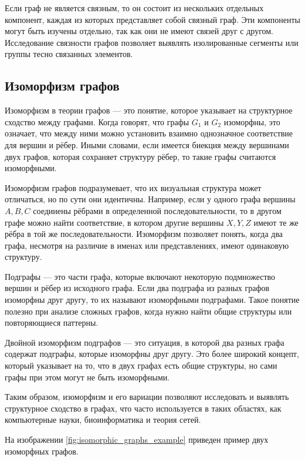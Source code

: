 Если граф не является связным, то он состоит из нескольких отдельных компонент, каждая из которых представляет собой связный граф. Эти компоненты могут быть изучены отдельно, так как они не имеют связей друг с другом. Исследование связности графов позволяет выявлять изолированные сегменты или группы тесно связанных элементов.


\subsection{Изоморфизм графов}


Изоморфизм в теории графов — это понятие, которое указывает на структурное сходство между графами. Когда говорят, что графы $G_1$ и $G_2$ изоморфны, это означает, что между ними можно установить взаимно однозначное соответствие для вершин и рёбер. Иными словами, если имеется биекция между вершинами двух графов, которая сохраняет структуру рёбер, то такие графы считаются изоморфными.

Изоморфизм графов подразумевает, что их визуальная структура может отличаться, но по сути они идентичны. Например, если у одного графа вершины $A, B, C$ соединены рёбрами в определенной последовательности, то в другом графе можно найти соответствие, в котором другие вершины $X, Y, Z$ имеют те же рёбра в той же последовательности. Изоморфизм позволяет понять, когда два графа, несмотря на различие в именах или представлениях, имеют одинаковую структуру.

Подграфы — это части графа, которые включают некоторую подмножество вершин и рёбер из исходного графа. Если два подграфа из разных графов изоморфны друг другу, то их называют изоморфными подграфами. Такое понятие полезно при анализе сложных графов, когда нужно найти общие структуры или повторяющиеся паттерны.

Двойной изоморфизм подграфов — это ситуация, в которой два разных графа содержат подграфы, которые изоморфны друг другу. Это более широкий концепт, который указывает на то, что в двух графах есть общие структуры, но сами графы при этом могут не быть изоморфными.

Таким образом, изоморфизм и его вариации позволяют исследовать и выявлять структурное сходство в графах, что часто используется в таких областях, как компьютерные науки, биоинформатика и теория сетей.

На изображении \ref{fig:isomorphic_graphs_example} приведен пример двух изоморфных графов.

